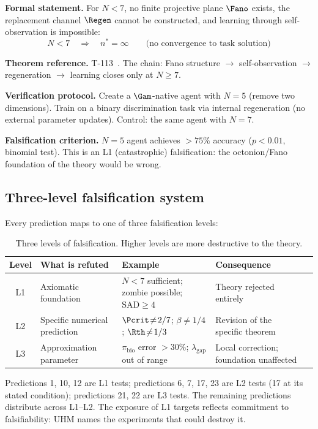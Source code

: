 \begin{predictionbox}[Prediction 10: N=7 minimality for autonomous learning \status{T}]
\textbf{Formal statement.}
For $N < 7$, no finite projective plane $\Fano$ exists, the replacement channel $\Regen$
cannot be constructed, and learning through self-observation is impossible:
\begin{equation}
  N < 7 \quad\Longrightarrow\quad n^* = \infty
  \qquad\text{(no convergence to task solution)}
\end{equation}

\medskip\noindent
\textbf{Theorem reference.} T-113~. The chain: Fano structure $\to$
self-observation $\to$ regeneration $\to$ learning closes only at $N \geq 7$.

\medskip\noindent
\textbf{Verification protocol.}
Create a $\Gam$-native agent with $N = 5$ (remove two dimensions). Train on a binary
discrimination task via internal regeneration (no external parameter updates). Control:
the same agent with $N = 7$.

\medskip\noindent
\textbf{Falsification criterion.}
$N = 5$ agent achieves $> 75\%$ accuracy ($p < 0.01$, binomial test). This is an L1
(catastrophic) falsification: the octonion/Fano foundation of the theory would be wrong.
\end{predictionbox}

\subsection{Three-level falsification system}

Every prediction maps to one of three falsification levels:

\begin{table}[H]
\centering
\caption{Three levels of falsification. Higher levels are more destructive to the theory.}
\label{tab:falsification-levels}
\small
\begin{tabular}{@{}clp{3.7cm}p{4.5cm}p{3.5cm}@{}}
\toprule
\textbf{Level} & \textbf{What is refuted} & \textbf{Example} & \textbf{Consequence} \\
\midrule
L1 & Axiomatic foundation & $N < 7$ sufficient; zombie possible; $\mathrm{SAD}\geq 4$ & Theory rejected entirely \\
L2 & Specific numerical prediction & $\Pcrit\!\neq\!2/7$; $\beta\!\neq\!1/4$; $\Rth\!\neq\!1/3$ & Revision of the specific theorem \\
L3 & Approximation parameter & $\pi_{\mathrm{bio}}$ error $> 30\%$; $\lambda_{\mathrm{gap}}$ out of range & Local correction; foundation unaffected \\
\bottomrule
\end{tabular}
\end{table}

\noindent
Predictions 1, 10, 12 are L1 tests; predictions 6, 7, 17, 23 are L2 tests (17 at its
stated condition); predictions 21, 22
are L3 tests. The remaining predictions distribute across L1--L2. The exposure of
L1 targets reflects commitment to falsifiability:
UHM names the experiments that could destroy it.
